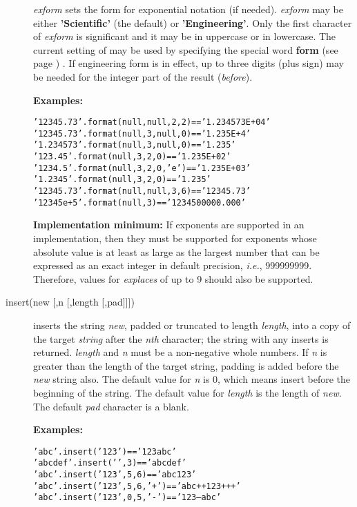 \begin{description}
\emph{exform} sets the form for exponential notation (if needed).
\emph{exform} may be either \textbf{'Scientific'} (the default)
or \textbf{'Engineering'}.  Only the first character of
\emph{exform} is significant and it may be in uppercase or in
lowercase.
The current setting of  may be used by specifying
the special word  \textbf{form} (see page \pageref{refswform}) .
If engineering form is in effect, up to three digits (plus sign) may be
needed for the integer part of the result (\emph{before}).
 
\textbf{Examples:}
\begin{alltt}
'12345.73'.format(null,null,2,2) == '1.234573E+04'
'12345.73'.format(null,3,null,0) == '1.235E+4'
'1.234573'.format(null,3,null,0) == '1.235'
'123.45'.format(null,3,2,0)      == '1.235E+02'
'1234.5'.format(null,3,2,0,'e')  == '1.235E+03'
'1.2345'.format(null,3,2,0)      == '1.235    '
'12345.73'.format(null,null,3,6) == '12345.73     '
'12345e+5'.format(null,3)        == '1234500000.000'
\end{alltt}
 \textbf{Implementation minimum:} If exponents are supported in an
implementation, then they must be supported for exponents whose
absolute value is at least as large as the largest number that can be
expressed as an exact integer in default precision, \emph{i.e.}, 999999999.
Therefore, values for \emph{explaces} of up to 9 should also be
supported.
\item[insert(new [,n [,length [,pad{]]]})]\label{refinsert}

inserts the string \emph{new}, padded or truncated to length
\emph{length}, into a copy of the target \emph{string} after the
\emph{n}\emph{th} character; the string with any inserts is returned.
\emph{length} and \emph{n} must be a non-negative whole numbers.
If \emph{n} is greater than the length of the target string,
padding is added before the \emph{new} string also.
The default value for \emph{n} is 0, which means insert before the
beginning of the string.  The default value for \emph{length} is
the length of \emph{new}.  The default \emph{pad} character is
a blank.
 
\textbf{Examples:}
\begin{alltt}
'abc'.insert('123')         == '123abc'
'abcdef'.insert(' ',3)      == 'abc def'
'abc'.insert('123',5,6)     == 'abc  123   '
'abc'.insert('123',5,6,'+') == 'abc++123+++'
'abc'.insert('123',0,5,'-') == '123--abc'
\end{alltt}


\end{description}
